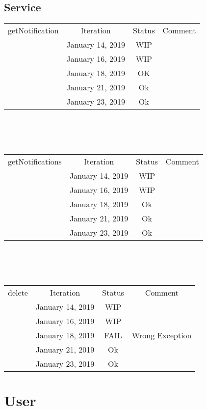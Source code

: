 \documentclass{scrreprt}
\begin{document}
\subsection{Service}
	\begin{tabularx}{12cm}{X|c|c|c}
		getNotification & Iteration & Status & Comment  \\
		& January 14, 2019 & WIP & \\
		& January 16, 2019 & WIP & \\
		& January 18, 2019 & OK & \\
		& January 21, 2019 & Ok & \\
		& January 23, 2019 & Ok & \\
	\end{tabularx}	
	\\ \\ \\
	\begin{tabularx}{12cm}{X|c|c|c}
		getNotifications & Iteration & Status & Comment  \\
		& January 14, 2019 & WIP & \\
		& January 16, 2019 & WIP & \\
		& January 18, 2019 & Ok & \\
		& January 21, 2019 & Ok & \\
		& January 23, 2019 & Ok & \\
	\end{tabularx}	
	\\ \\ \\	
	\begin{tabularx}{12cm}{X|c|c|c}
		delete & Iteration & Status & Comment  \\
		& January 14, 2019 & WIP & \\
		& January 16, 2019 & WIP & \\
		& January 18, 2019 & FAIL & Wrong Exception \\
		& January 21, 2019 & Ok & \\
		& January 23, 2019 & Ok & \\
	\end{tabularx}	

\section{User}

\end{document}
